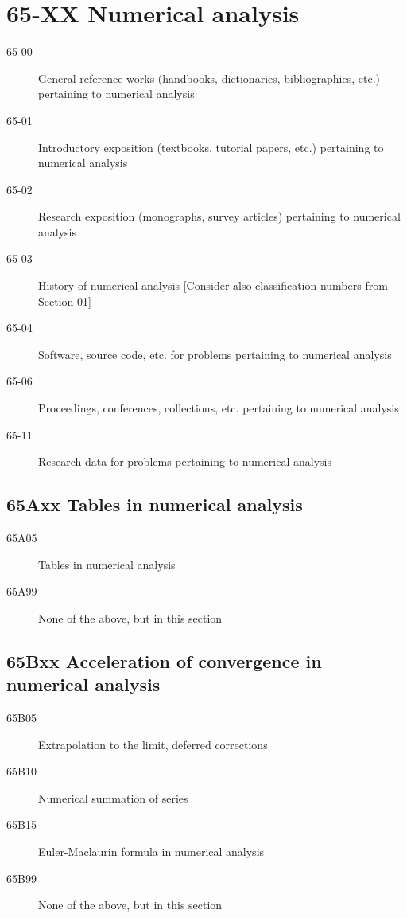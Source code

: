 \section*{65-XX Numerical analysis }\label{65-XX}
\begin{description}
\item [65-00]\label{65-00} General reference works (handbooks, dictionaries, bibliographies, etc.) pertaining to numerical analysis
\item [65-01]\label{65-01} Introductory exposition (textbooks, tutorial papers, etc.) pertaining to numerical analysis
\item [65-02]\label{65-02} Research exposition (monographs, survey articles) pertaining to numerical analysis
\item [65-03]\label{65-03} History of numerical analysis [Consider also classification numbers from Section \hyperref[01-XX]{01}]
\item [65-04]\label{65-04} Software, source code, etc. for problems pertaining to numerical analysis
\item [65-06]\label{65-06} Proceedings, conferences, collections, etc. pertaining to numerical analysis
\item [65-11]\label{65-11} Research data for problems pertaining to numerical analysis
\end{description}
\subsection*{65Axx  Tables in numerical analysis}\label{65Axx}
\begin{description}  
\item [65A05]\label{65A05} Tables in numerical analysis
\item [65A99]\label{65A99} None of the above, but in this section
\end{description}
\subsection*{65Bxx  Acceleration of convergence in numerical analysis }\label{65Bxx}
\begin{description}  
\item [65B05]\label{65B05} Extrapolation to the limit, deferred corrections
\item [65B10]\label{65B10} Numerical summation of series
\item [65B15]\label{65B15} Euler-Maclaurin formula in numerical analysis
\item [65B99]\label{65B99} None of the above, but in this section
\end{description}
